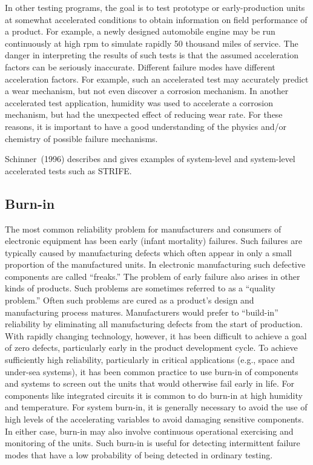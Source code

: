 In other testing programs, the goal is to test prototype or
early-production units at somewhat accelerated conditions to obtain
information on field performance of a product. For example, a newly
designed automobile engine may be run continuously at high rpm to
simulate rapidly 50 thousand miles of service. The danger in
interpreting the results of such tests is that the assumed
acceleration factors can be seriously inaccurate. Different failure
modes have different acceleration factors. For example, such an
accelerated test may accurately predict a wear mechanism, but not even
discover a corrosion mechanism. In another accelerated test
application, humidity was used to accelerate a corrosion mechanism,
but had the unexpected effect of reducing wear rate. For these
reasons, it is important to have a good understanding of the
physics and/or chemistry of possible failure mechanisms.

Schinner~(1996) describes and gives examples of system-level and
system-level accelerated tests such as STRIFE.

\subsection{Burn-in}
The most common reliability problem for manufacturers and consumers
of electronic equipment has been early (infant mortality) failures.
Such failures are typically caused by manufacturing defects which
often appear in only a small proportion of the manufactured
units. In electronic manufacturing such defective components are
called ``freaks.'' The problem of early failure also arises in other
kinds of products. Such problems are sometimes referred to as a
``quality problem.''  Often such problems are cured as a product's
design and manufacturing process matures. Manufacturers would prefer
to ``build-in'' reliability by eliminating all manufacturing defects
from the start of production. With rapidly changing technology,
however, it has been difficult to achieve a goal of zero defects,
particularly early in the product development cycle.  To achieve
sufficiently high reliability, particularly in critical applications
(e.g., space and under-sea systems), it has been common practice to
use burn-in of components and systems to screen out the units that
would otherwise fail early in life. For components like integrated
circuits it is common to do burn-in at high humidity and
temperature. For system burn-in, it is generally necessary to avoid
the use of high levels of the accelerating variables to avoid
damaging sensitive components. In either case, burn-in may also
involve continuous operational exercising and monitoring of the
units. Such burn-in is useful for detecting intermittent failure
modes that have a low probability of being detected in ordinary
testing.

